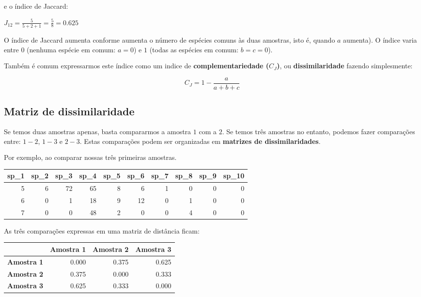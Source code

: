 \documentclass[
]{book}
\begin{document}
e o índice de Jaccard:

\(J_{12} = \frac{5}{5 + 2 + 1} = \frac{5}{8} = 0.625\)

O índice de Jaccard aumenta conforme aumenta o número de espécies comuns às duas amostras, isto é, quando \(a\) aumenta). O índice varia entre \(0\) (nenhuma espécie em comum: \(a = 0\)) e \(1\) (todas as espécies em comum: \(b = c = 0\)).

Também é comum expressarmos este índice como um indice de \textbf{complementariedade (\(C_J\))}, ou \textbf{dissimilaridade} fazendo simplesmente:

\[C_{J} = 1 - \frac{a}{a + b + c}\]

\hypertarget{matriz-de-dissimilaridade}{%
\subsection{Matriz de dissimilaridade}\label{matriz-de-dissimilaridade}}

Se temos duas amostras apenas, basta compararmos a amostra \(1\) com a \(2\). Se temos três amostras no entanto, podemos fazer comparações entre: \(1-2\), \(1-3\) e \(2-3\). Estas comparações podem ser organizadas em \textbf{matrizes de dissimilaridades}.

Por exemplo, ao comparar nossas três primeiras amostras.

\begin{table}
\centering\begingroup\fontsize{10}{12}\selectfont

\begin{tabular}{r|r|r|r|r|r|r|r|r|r}
\hline
sp\_1 & sp\_2 & sp\_3 & sp\_4 & sp\_5 & sp\_6 & sp\_7 & sp\_8 & sp\_9 & sp\_10\\
\hline
5 & 6 & 72 & 65 & 8 & 6 & 1 & 0 & 0 & 0\\
\hline
6 & 0 & 1 & 18 & 9 & 12 & 0 & 1 & 0 & 0\\
\hline
7 & 0 & 0 & 48 & 2 & 0 & 0 & 4 & 0 & 0\\
\hline
\end{tabular}
\endgroup{}
\end{table}

As três comparações expressas em uma matriz de distância ficam:

\begin{table}
\centering
\begin{tabular}{>{}l|r|r|r}
\hline
  & Amostra 1 & Amostra 2 & Amostra 3\\
\hline
\textbf{Amostra 1} & 0.000 & 0.375 & 0.625\\
\hline
\textbf{Amostra 2} & 0.375 & 0.000 & 0.333\\
\hline
\textbf{Amostra 3} & 0.625 & 0.333 & 0.000\\
\hline
\end{tabular}
\end{table}
\end{document}
